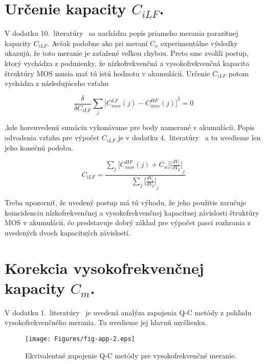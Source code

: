 \section{Určenie kapacity $C_{iLF}$.}\label{sec:E.3}

V dodatku 10.\ literatúry~\cite{App.4} sa nachádza popis priameho
merania parazitnej kapacity $C_{iLF}$. Avšak podobne ako pri meraní
$C_x$ experimentálne výsledky ukazujú, že toto meranie je zaťažené
veľkou chybou. Preto sme zvolili postup, ktorý vychádza z podmienky,
že nízkofrekvenčná a vysokofrekvenčná kapacita štruktúry MOS musia mať
tú istú hodnotu v akumulácii. Určenie $C_{iLF}$ potom vychádza z
následujúceho vzťahu

\begin{equation}\label{eq:E.4}
  \frac{\delta}{\delta C_{iLF}} \sum\limits_{j} {\Big[C_{mos}^{LF}(j) - C_{mos}^{HF}(j)\Big]}^2 = 0
\end{equation}

,kde horeuvedenú sumáciu vykonávame pre body namerané v
akumulácii. Popis odvodenia vzťahu pre výpočet $C_{iLF}$ je v dodatku
4.\ literatúry~\cite{App.4} a tu uvedieme len jeho konečnú podobu.

\begin{equation}\label{eq:E.5}
  C_{iLF} = \frac{\sum\limits_{j}{\Big[C_{mos}^{HF}(j)+C_{w}\Big]}{\Big[\frac{dV_i}{dV_g}\Big]}_j}{\sum\limits_{j}{\Big[\frac{dV_i}{dV_g}\Big]}_j}
\end{equation}

Treba upozorniť, že uvedený postup má tú výhodu, že jeho použitie
zaručuje koincidenciu nízkofrekvenčnej a vysokofrekvenčnej kapacitnej
závislosti štruktúry MOS v akumulácii, čo predstavuje dobrý základ pre
výpočet pascí rozhrania z uvedených dvoch kapacitných závislostí.


\section{Korekcia vysokofrekvenčnej kapacity $C_m$.}\label{sec:E.4}

V dodatku 1.\ literatúry~\cite{App.2} je uvedená analýza zapojenia Q-C
metódy z pohľadu vysokofrekvenčného merania. Tu uvedieme jej hlavnú
myšlienku.

\begin{figure}[h!]\centering
  \texttt{[image: Figures/fig-app-2.eps]}
  \caption[Ekvivalentné zapojenie Q-C metódy pre vysokofrekvenčné
    meranie]{Ekvivalentné zapojenie Q-C metódy pre vysokofrekvenčné
    meranie.}\label{fig:App.2}
\end{figure}

